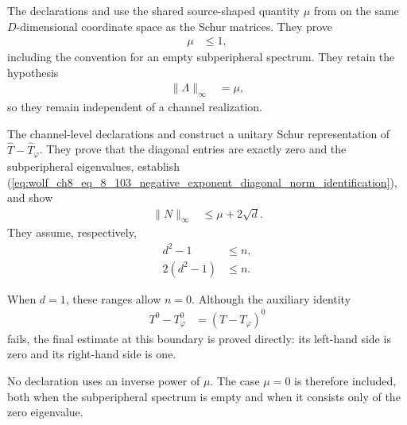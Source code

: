 \documentclass{article}
\begin{document}
The declarations
 and
 use the
shared source-shaped quantity $\mu$ from
 on the same $D$-dimensional
coordinate space as the Schur matrices. They prove
\begin{align}
    \mu
        &\leq1,
    \label{eq:wolf_ch8_eq_8_103_negative_exponent_subperipheral_bound}
\end{align}
including the convention for an empty subperipheral spectrum. They retain the
hypothesis
\begin{align}
    \lVert\Lambda\rVert_\infty
        &=\mu,
    \label{eq:wolf_ch8_eq_8_103_negative_exponent_diagonal_norm_identification}
\end{align}
so they remain independent of a channel realization.

The channel-level declarations
 and
 construct a unitary Schur
representation of $\widehat T-\widehat T_\varphi$. They prove that the
diagonal entries are exactly zero and the subperipheral eigenvalues, establish
(\ref{eq:wolf_ch8_eq_8_103_negative_exponent_diagonal_norm_identification}),
and show
\begin{align}
    \lVert N\rVert_\infty
        &\leq\mu+2\sqrt d.
    \label{eq:wolf_ch8_eq_8_103_negative_exponent_nilpotent_norm_bound}
\end{align}
They assume, respectively,
\begin{align}
    d^2-1
        &\leq n,
    \label{eq:wolf_ch8_eq_8_103_negative_exponent_channel_decl_coarse_range}\\
    2(d^2-1)
        &\leq n.
    \label{eq:wolf_ch8_eq_8_103_negative_exponent_channel_decl_refined_range}
\end{align}

When $d=1$, these ranges allow $n=0$. Although the auxiliary identity
\begin{align}
    T^0-T_\varphi^0
        &=(T-T_\varphi)^0
    \label{eq:wolf_ch8_eq_8_103_negative_exponent_boundary_auxiliary_identity}
\end{align}
fails, the final estimate at this boundary is proved directly: its left-hand
side is zero and its right-hand side is one.

No declaration uses an inverse power of $\mu$. The case $\mu=0$ is therefore
included, both when the subperipheral spectrum is empty and when it consists
only of the zero eigenvalue.
\end{document}
